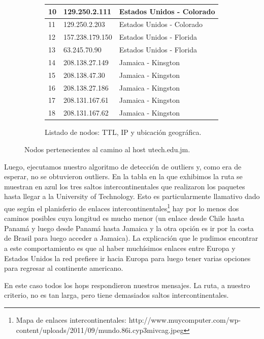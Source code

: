 \begin{figure}[ht]
\begin{subfigure}[b]{.39\textwidth}
\begin{tabular}{ l l l }
      10 & 129.250.2.111 & Estados Unidos - Colorado\\ \hline
      11 & 129.250.2.203 & Estados Unidos - Colorado\\ \hline
      12 & 157.238.179.150 & Estados Unidos - Florida\\ \hline
      13 & 63.245.70.90 & Estados Unidos - Florida\\ \hline
      \rowcolor[RGB]{196,214,255}
      14 & 208.138.27.149 & Jamaica - Kinsgton\\ \hline
      15 & 208.138.47.30 & Jamaica - Kingston\\ \hline
      16 & 208.138.27.186 & Jamaica - Kingston\\ \hline
      17 & 208.131.167.61 & Jamaica - Kingston\\ \hline
      18 & 208.131.167.62 & Jamaica - Kingston \\ \hline
      \hline
    \end{tabular}
    \label{fig:jamaica_list}
    \caption{Listado de nodos: TTL, IP y ubicación geográfica.}
  \end{subfigure}
  \caption{Nodos pertenecientes al camino al host utech.edu.jm.}
\end{figure}

\par Luego, ejecutamos nuestro algoritmo de detección de outliers y, como era de esperar, no se obtuvieron outliers. En la tabla en la que exhibimos la ruta se muestran en azul los tres saltos intercontinentales que realizaron los paquetes hasta llegar a la University of Technology. Esto es particularmente llamativo dado que según el planisferio de enlaces intercontinentales\footnote{Mapa de enlaces intercontinentales: http://www.muycomputer.com/wp-content/uploads/2011/09/mundo.86i.cyp3mivcag.jpeg} hay por lo menos dos caminos posibles cuya longitud es mucho menor (un enlace desde Chile hasta Panamá y luego desde Panamá hasta Jamaica y la otra opción es ir por la costa de Brasil para luego acceder a Jamaica). La explicación que le pudimos encontrar a este comportamiento es que al haber muchísimos enlaces entre Europa y Estados Unidos la red prefiere ir hacia Europa para luego tener varias opciones para regresar al continente americano.
\par En este caso todos los hops respondieron nuestros mensajes. La ruta, a nuestro criterio, no es tan larga, pero tiene demasiados saltos intercontinentales.
